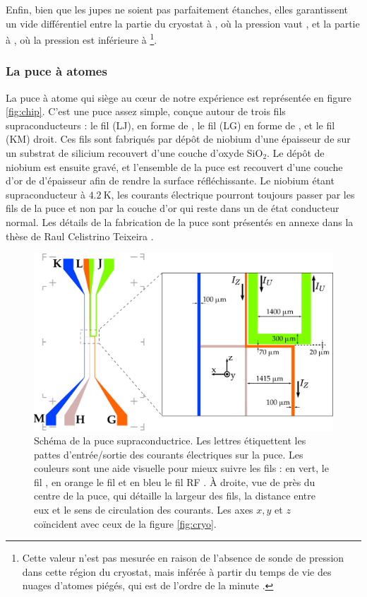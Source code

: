 Enfin, bien que les jupes ne soient pas parfaitement étanches, elles garantissent un vide différentiel entre la partie du cryostat à , où la pression vaut , et la partie à \Khe, où la pression est inférieure à \footnote{
Cette valeur n'est pas mesurée en raison de l'absence de sonde de pression dans cette région du cryostat, mais inférée à partir du temps de vie des nuages d'atomes piégés, qui est de l'ordre de la minute \cite{ENS_CHIPLIFETIME}.}.

	\subsubsection*{La puce à atomes}
\noindent La puce à atome qui siège au c\oe ur de notre expérience est représentée en figure \eqref{fig:chip}.
C'est une puce assez simple, conçue autour de trois fils supraconducteurs : le fil (LJ), en forme de , le fil (LG) en forme de , et le fil (KM) droit.
Ces fils sont fabriqués par dépôt de niobium d'une épaisseur de  sur un substrat de silicium recouvert d'une couche d'oxyde SiO$_2$.
Le dépôt de niobium est ensuite gravé, et l'ensemble de la puce est recouvert d'une couche d'or de  d'épaisseur afin de rendre la surface réfléchissante.
Le niobium étant supraconducteur à $\SI{4.2}{\K}$, les courants électrique pourront toujours passer par les fils de la puce et non par la couche d'or qui reste dans un de état conducteur normal.
Les détails de la fabrication de la puce sont présentés en annexe dans la thèse de Raul Celistrino Teixeira \cite{PHD_CELISTRINO}.
%
\begin{figure}[!h]
\centering
\includegraphics[width=\linewidth]{figures/setup/coldatoms/chip}
\caption[Schéma de la puce à atomes supraconductrice]{Schéma de la puce supraconductrice.
Les lettres étiquettent les pattes d'entrée/sortie des courants électriques sur la puce.
Les couleurs sont une aide visuelle pour mieux suivre les fils : en vert, le \og fil \fg{}, en orange le \og fil \fg{} et en bleu le \og fil RF \fg{}.
\`A droite, vue de près du centre de la puce, qui détaille la largeur des fils, la distance entre eux et le sens de circulation des courants.
Les axes $x,y$ et $z$ coïncident avec ceux de la figure \eqref{fig:cryo}.
}
\label{fig:chip}
\end{figure}
%

